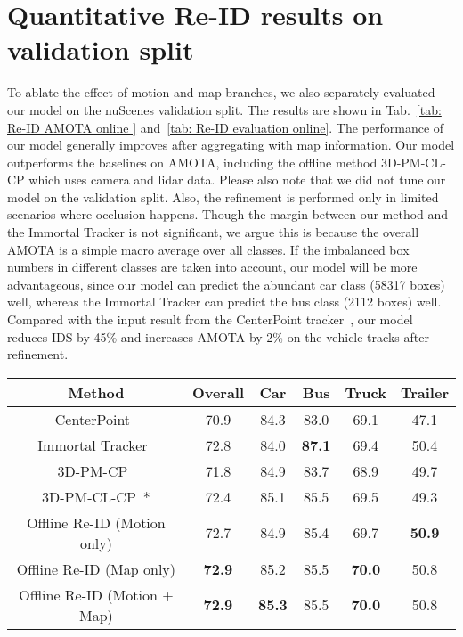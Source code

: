 \documentclass{article} \usepackage{iclr2023_conference,times}
\begin{document}
\section{Quantitative Re-ID results on validation split}
\label{sec: Re-ID results val}
To ablate the effect of motion and map branches, we also separately evaluated our model on the nuScenes validation split. The results are shown in Tab.~\ref{tab: Re-ID AMOTA online } and~\ref{tab: Re-ID evaluation online}. The performance of our model generally improves after aggregating with map information. Our model outperforms the baselines on AMOTA, including the offline method 3D-PM-CL-CP which uses camera and lidar data. Please also note that we did not tune our model on the validation split. Also, the refinement is performed only in limited scenarios where occlusion happens. Though the margin between our method and the Immortal Tracker is not significant, we argue this is because the overall AMOTA is a simple macro average over all classes. If the imbalanced box numbers in different classes are taken into account, our model will be more advantageous, since our model can predict the abundant car class (58317 boxes) well, whereas the Immortal Tracker can predict the bus class (2112 boxes) well. Compared with the input result from the CenterPoint tracker~\cite{Centerpoint}, our model reduces IDS by 45\%  and increases AMOTA by 2\% on the vehicle tracks after refinement.


\begin{table*}[htb]
    \centering
    \begin{tabular}{c|c|cccc}
    \textbf{Method}            & \textbf{Overall}       & \textbf{Car}           & \textbf{Bus}           & \textbf{Truck}         & \textbf{Trailer}       \\ \hline
     CenterPoint~\cite{Centerpoint} & 70.9          & 84.3          & 83.0          & 69.1          & 47.1          \\
    Immortal Tracker~\cite{Immortaltrackers}         & 72.8          & 84.0          & \textbf{87.1} & 69.4          & 50.4          \\
    3D-PM-CP~\cite{batch3dmot}          & 71.8 & 84.9          & 83.7          & 68.9 & 49.7 \\
    3D-PM-CL-CP~\cite{batch3dmot}*       & 72.4 & 85.1 & 85.5          & 69.5          & 49.3 \\ \hline
    Offline Re-ID (Motion only)            & 72.7          & 84.9          & 85.4 & 69.7          & \textbf{50.9} \\
    Offline Re-ID (Map only)               & \textbf{72.9} & 85.2          & 85.5          & \textbf{70.0} & 50.8          \\
    Offline Re-ID (Motion + Map)      & \textbf{72.9} & \textbf{85.3} & 85.5          & \textbf{70.0} & 50.8         
    \end{tabular}
    \caption{Comparison of AMOTA scores on the nuScenes validation split (official nuScenes setup). * denotes the use of sensor data for tracking.}
    \label{tab: Re-ID AMOTA online }
\end{table*}
\end{document}
